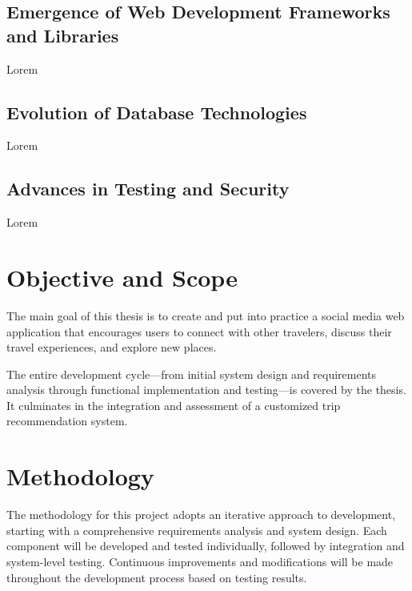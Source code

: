 \subsection{Emergence of Web Development Frameworks and Libraries}
\par Lorem \cite{}

\subsection{Evolution of Database Technologies}
\par Lorem \cite{}

\subsection{Advances in Testing and Security}
\par Lorem \cite{}



\section{Objective and Scope}
\par The main goal of this thesis is to create and put into practice a social media web application that encourages users to connect with other travelers, discuss their travel experiences, and explore new places.

The entire development cycle—from initial system design and requirements analysis through functional implementation and testing—is covered by the thesis. It culminates in the integration and assessment of a customized trip recommendation system.

\section{Methodology}
\par The methodology for this project adopts an iterative approach to development, starting with a comprehensive requirements analysis and system design. Each component will be developed and tested individually, followed by integration and system-level testing. Continuous improvements and modifications will be made throughout the development process based on testing results.